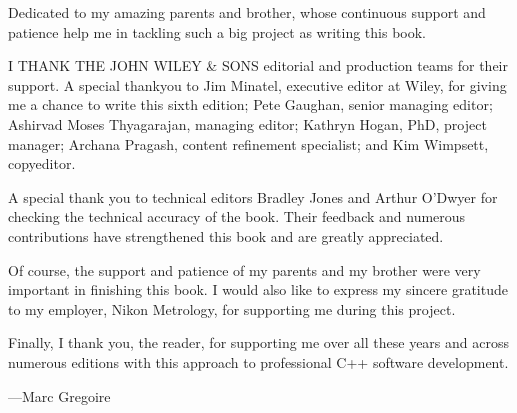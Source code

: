 Dedicated to my amazing parents and brother, whose continuous support and patience help me in tackling such a big project as writing this book.

I THANK THE JOHN WILEY \& SONS editorial and production teams for their support. A special thankyou to Jim Minatel, executive editor at Wiley, for giving me a chance to write this sixth edition; Pete Gaughan, senior managing editor; Ashirvad Moses Thyagarajan, managing editor; Kathryn Hogan, PhD, project manager; Archana Pragash, content refinement specialist; and Kim Wimpsett, copyeditor.

A special thank you to technical editors Bradley Jones and Arthur O’Dwyer for checking the technical accuracy of the book. Their feedback and numerous contributions have strengthened this book and are greatly appreciated.

Of course, the support and patience of my parents and my brother were very important in finishing this book. I would also like to express my sincere gratitude to my employer, Nikon Metrology, for supporting me during this project.

Finally, I thank you, the reader, for supporting me over all these years and across numerous editions with this approach to professional C++ software development.

\begin{flushright}
—Marc Gregoire
\end{flushright}